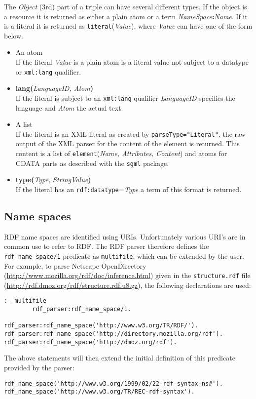 The \emph{Object} (3rd) part of a triple can have several different
types.  If the object is a resource it is returned as either a plain
atom or a term \mbox{{\it NameSpace}{\bf :}{\it Name}}.  If it is a
literal it is returned as \texttt{literal}({\it Value}), where {\it Value}
can have one of the form below.

\begin{itemize}
    \item {An atom}\mbox{}\\
If the literal {\it Value} is a plain atom is a literal value not
subject to a datatype or {\tt xml:lang} qualifier.

    \item {\bf lang}{\bf (}{\it LanguageID, Atom}{\bf )}\mbox{}\\
If the literal is subject to an {\tt xml:lang} qualifier
{\it LanguageID} specifies the language and {\it Atom} the
actual text.

    \item {A list}\mbox{}\\
If the literal is an XML literal as created by
\mbox{\tt parseType="Literal"}, the raw output of the XML parser for the
content of the element is returned. This content is a list of
\texttt{element}({\it Name, Attributes, Content}) and atoms for CDATA parts as
described with the {\tt sgml} package.

    \item {\bf type}{\bf (}{\it Type, StringValue}{\bf )}\mbox{}\\
If the literal has an {\tt rdf:datatype}={\it Type} a term of this
format is returned.
\end{itemize}

\subsection{Name spaces}

RDF name spaces are identified using URIs. Unfortunately various URI's
are in common use to refer to RDF. The RDF parser
therefore defines the \texttt{rdf\_name\_space/1} predicate as
\texttt{multifile}, which can be
extended by the user. For example, to parse Netscape
OpenDirectory (\url{http://www.mozilla.org/rdf/doc/inference.html})
given in the {\tt structure.rdf} file
(\url{http://rdf.dmoz.org/rdf/structure.rdf.u8.gz}), the following declarations are used:

\begin{verbatim}
:- multifile
        rdf_parser:rdf_name_space/1.

rdf_parser:rdf_name_space('http://www.w3.org/TR/RDF/').
rdf_parser:rdf_name_space('http://directory.mozilla.org/rdf').
rdf_parser:rdf_name_space('http://dmoz.org/rdf').
\end{verbatim}
The above statements will then extend
the initial definition of this predicate provided by the parser:
\begin{verbatim}
rdf_name_space('http://www.w3.org/1999/02/22-rdf-syntax-ns#').
rdf_name_space('http://www.w3.org/TR/REC-rdf-syntax').
\end{verbatim}


